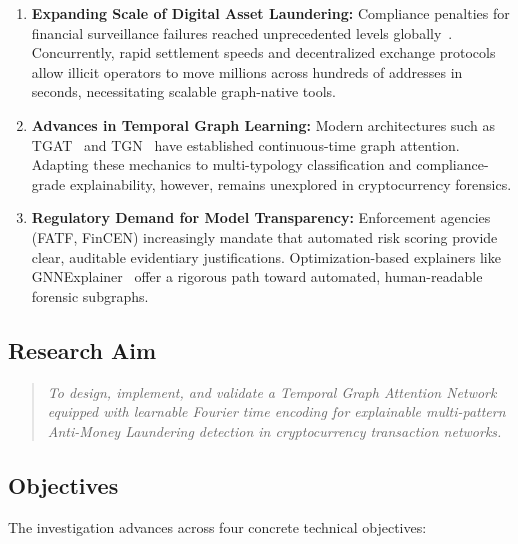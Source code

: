 \begin{enumerate}
	\item \textbf{Expanding Scale of Digital Asset Laundering:} Compliance penalties for financial surveillance failures reached unprecedented levels globally~\cite{chainalysis2023}. Concurrently, rapid settlement speeds and decentralized exchange protocols allow illicit operators to move millions across hundreds of addresses in seconds, necessitating scalable graph-native tools.

	\item \textbf{Advances in Temporal Graph Learning:} Modern architectures such as TGAT~\cite{xu2020tgat} and TGN~\cite{rossi2020tgn} have established continuous-time graph attention. Adapting these mechanics to multi-typology classification and compliance-grade explainability, however, remains unexplored in cryptocurrency forensics.

	\item \textbf{Regulatory Demand for Model Transparency:} Enforcement agencies (FATF, FinCEN) increasingly mandate that automated risk scoring provide clear, auditable evidentiary justifications. Optimization-based explainers like GNNExplainer~\cite{ying2019gnnexplainer} offer a rigorous path toward automated, human-readable forensic subgraphs.
\end{enumerate}

\subsection{Research Aim}
\label{subsec:aim}

\begin{quote}
\textit{To design, implement, and validate a Temporal Graph Attention Network equipped with learnable Fourier time encoding for explainable multi-pattern Anti-Money Laundering detection in cryptocurrency transaction networks.}
\end{quote}

\subsection{Objectives}
\label{subsec:objectives}

The investigation advances across four concrete technical objectives:

